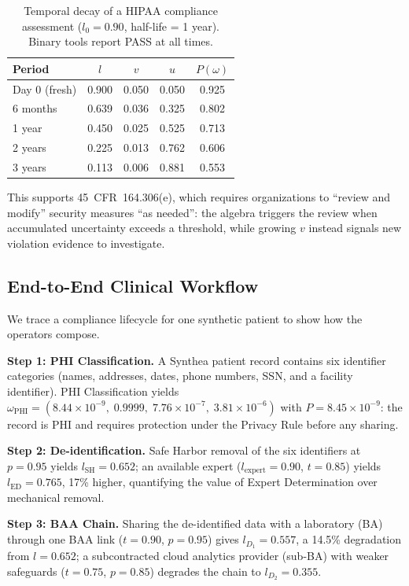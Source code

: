 \documentclass[conference]{IEEEtran}
\begin{document}
\begin{table}[t]
\centering
\caption{Temporal decay of a HIPAA compliance assessment ($l_0 = 0.90$, half-life = 1 year). Binary tools report PASS at all times.}
\label{tab:temporal_decay}
\footnotesize
\begin{tabular}{@{}lcccc@{}}
\toprule
Period & $l$ & $v$ & $u$ & $P(\omega)$ \\
\midrule
Day 0 (fresh)  & 0.900 & 0.050 & 0.050 & 0.925 \\
6 months       & 0.639 & 0.036 & 0.325 & 0.802 \\
1 year         & 0.450 & 0.025 & 0.525 & 0.713 \\
2 years        & 0.225 & 0.013 & 0.762 & 0.606 \\
3 years        & 0.113 & 0.006 & 0.881 & 0.553 \\
\bottomrule
\end{tabular}
\end{table}

This supports 45~CFR~164.306(e), which requires organizations to ``review and
modify'' security measures ``as needed'': the algebra triggers the review when
accumulated uncertainty exceeds a threshold, while growing $v$ instead
signals new violation evidence to investigate.

\subsection{End-to-End Clinical Workflow}

We trace a compliance lifecycle for one synthetic patient to show how the
operators compose.

\textbf{Step 1: PHI Classification.} A Synthea patient record contains
six identifier categories (names, addresses, dates, phone numbers, SSN,
and a facility identifier). PHI Classification yields
$\omega_{\text{PHI}} = (8.44 \times 10^{-9},\; 0.9999,\; 7.76 \times 10^{-7},\; 3.81 \times 10^{-6})$
with $P = 8.45 \times 10^{-9}$: the record is PHI and requires protection
under the Privacy Rule before any sharing.

\textbf{Step 2: De-identification.} Safe Harbor removal of the six
identifiers at $p = 0.95$ yields $l_{\text{SH}} = 0.652$; an available
expert ($l_{\text{expert}} = 0.90$, $t = 0.85$) yields
$l_{\text{ED}} = 0.765$, 17\% higher, quantifying the value of Expert
Determination over mechanical removal.

\textbf{Step 3: BAA Chain.} Sharing the de-identified data with a
laboratory (BA) through one BAA link ($t = 0.90$, $p = 0.95$) gives
$l_{D_1} = 0.557$, a 14.5\% degradation from $l = 0.652$; a
subcontracted cloud analytics provider (sub-BA) with weaker safeguards
($t = 0.75$, $p = 0.85$) degrades the chain to $l_{D_2} = 0.355$.
\end{document}
